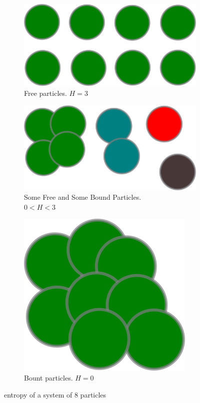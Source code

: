 	\begin{figure}
		\begin{subfigure}{.5\textwidth}
			\includegraphics[width=.5\linewidth]{entropy_cluster/step1.png}
			\caption{Free particles. $H=3$}
		\end{subfigure}
		\begin{subfigure}{.5\textwidth}
			\includegraphics[width=.5\linewidth]{entropy_cluster/step2.png}
			\caption{Some Free and Some Bound Particles.\\ $0 < H < 3$}
		\end{subfigure}
		\begin{subfigure}{.5\textwidth}
			\includegraphics[width=.5\linewidth]{entropy_cluster/step3.png}
			\caption{Bount particles. $H=0$}
		\end{subfigure}
		\caption{entropy of a system of $8$ particles}
	\end{figure}
	

